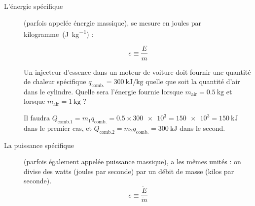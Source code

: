		\begin{description}
		
			\item[L’énergie spécifique] (parfois appelée énergie massique), se mesure en \si{joules} \si{par} \si{kilogramme}~(\si{\joule\per\kilogram}) :

				\begin{equation}
					e \equiv \frac{E}{m}
				\label{def_énergie_spécifique}
				\end{equation}

		
				\begin{anexample}
					Un injecteur d’essence dans un moteur de voiture doit fournir une quantité de chaleur spécifique $q_{\text{comb.}} = \SI{300}{\kilo\joule\per\kilogram}$ quelle que soit la quantité d’air dans le cylindre. Quelle sera l’énergie fournie lorsque $m_\text{air} = \SI{0,5}{\kilogram}$ et lorsque $m_\text{air} = \SI{1}{\kilogram}$ ?
		
					\begin{answer}Il faudra $Q_{\text{comb.}1} = m_1 q_{\text{comb.}} = \num{0,5} \times \num{300e3} = \num{150e3} = \SI{150}{\kilo\joule}$ dans le premier cas, et $Q_{\text{comb.}2} = m_2 q_{\text{comb.}} = \SI{300}{\kilo\joule}$ dans le second.\end{answer}
					\end{anexample}

		\item[La puissance spécifique] (parfois également appelée puissance massique), a les mê\-mes unités : on divise des \si{watts} (\si{joules} \si{par} \si{seconde}) par un débit de masse (\si{kilos} \si{par} \si{seconde}).
			\begin{equation}
				e \equiv \frac{\dot{E}}{\dot{m}}
				\label{def_puissance_spécifique}
			\end{equation}



\end{description}
